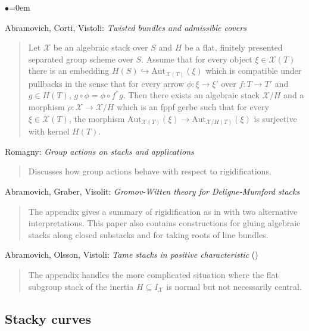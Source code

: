\begin{list}{$\bullet$}{\leftmargin=0em}
\item Abramovich, Corti, Vistoli:
\emph{Twisted bundles and admissible covers} \cite{acv}
\begin{quote}
Let $\mathcal{X}$ be an algebraic stack over $S$ and $H$ be a flat, finitely
presented separated group scheme over $S$.  Assume that for every object
$\xi \in \mathcal{X}(T)$ there is an embedding
$H(S) \hookrightarrow \text{Aut}_{\mathcal{X}(T)}(\xi)$ which is compatible
under pullbacks in the sense that for every arrow $\phi: \xi \rightarrow \xi'$
over $f: T \rightarrow T'$ and $g \in H(T)$, $g \circ \phi = \phi \circ f^*g$.
Then there exists an algebraic stack $\mathcal{X}/H$ and a
morphism $\rho: \mathcal{X} \rightarrow \mathcal{X}/H$ which is
an fppf gerbe such that for every $\xi \in \mathcal{X}(T)$, the morphism
$\text{Aut}_{\mathcal{X}(T)} (\xi)
\rightarrow \text{Aut}_{\mathcal{X}/H (T)} (\xi) $
is surjective with kernel $H(T)$.
\end{quote}
\smallskip

\item Romagny:  \emph{Group actions on stacks and applications}
\cite{romagny_actions}
\begin{quote}
Discusses how group actions behave with respect to rigidifications.
\end{quote}
\smallskip

\item Abramovich, Graber, Visolit:
\emph{Gromov-Witten theory for Deligne-Mumford stacks} \cite{agv}
\begin{quote}
The appendix gives a summary of rigidification as in \cite{acv} with two
alternative interpretations.  This paper also contains constructions for
gluing algebraic stacks along closed substacks and for taking roots of line
bundles.
\end{quote}
\smallskip

\item
Abramovich, Olsson, Vistoli: \emph{Tame stacks in positive characteristic}
(\cite{tame})
\begin{quote}
The appendix handles the more complicated situation where the flat subgroup
stack of the inertia $H \subseteq I_\mathcal{X}$ is normal but not
necessarily central.
\end{quote}
\end{list}

\subsection{Stacky curves}
\label{subsection-stacky-curves}

